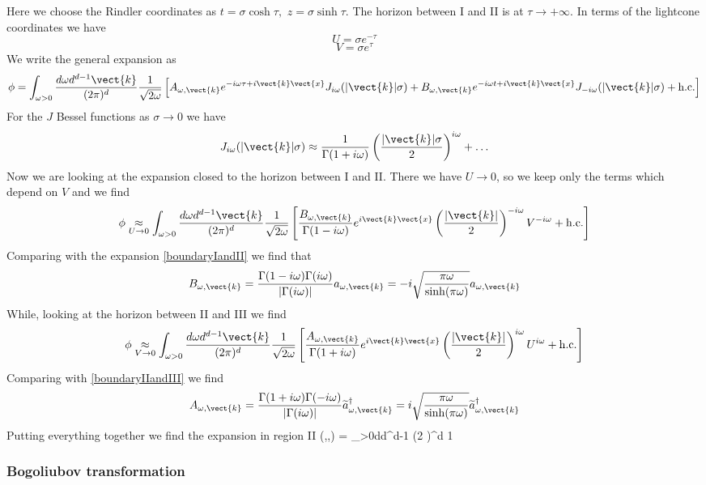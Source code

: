 Here we choose the Rindler coordinates as $t =\sigma  \cosh \tau,\,\, z = \sigma \sinh \tau$. The horizon between I and II is at $\tau\rightarrow +\infty$. In terms of the lightcone coordinates
we have
\[
U = \sigma e^{-\tau}
\]
\[
V = \sigma e^{\tau}
\]
We write the general expansion 
as
\[
\phi = \int_{\omega>0}{d\omega d^{d-1}\vect{k} \over (2 \pi)^d} {1\over \sqrt{2\omega}}\left[A_{\omega,\vect{k}}e^{-i \omega \tau + i \vect{k}\vect{x}} J_{i\omega}(|\vect{k}|\sigma) +
B_{\omega,\vect{k}} e^{-i \omega t + i \vect{k} \vect{x}} J_{-i \omega}(|\vect{k}|\sigma) + {\rm h.c.} \right]
\]
For the $J$ Bessel functions as $\sigma\rightarrow 0$ we have
\[
J_{i\omega}(|\vect{k}|\sigma) \approx {1\over \Gamma(1+i\omega)} \left({|\vect{k}|\sigma \over 2}\right)^{i\omega} +\ldots
\]
Now we are looking at the expansion closed to the horizon between I and II. There we have $U\rightarrow 0$, 
so we keep only the terms which depend on $V$ and we find
\[
\phi \underset{U \rightarrow 0}{\approx} \int_{\omega>0}{d\omega d^{d-1}\vect{k} \over (2 \pi)^d} {1\over \sqrt{2\omega}}
\left[
{B_{\omega,\vect{k}}\over \Gamma(1-i\omega)} e^{i\vect{k} \vect{x}}\left({|\vect{k}|\over 2}\right)^{-i\omega} V^{-i\omega}+{\rm h.c.}
\right]
\]
Comparing with the expansion \eqref{boundaryIandII} we find that
\[
B_{\omega,\vect{k}} = {\Gamma(1-i\omega) \Gamma(i\omega) \over |\Gamma(i\omega)|}a_{\omega,\vect{k}}= -i\sqrt{\pi \omega \over \sinh(\pi \omega)} a_{\omega,\vect{k}}
\]
While, looking at the horizon between II and III we find
\[
\phi \underset{V \rightarrow 0}{\approx} \int_{\omega>0} {d\omega d^{d-1} \vect{k}  \over (2 \pi)^d} {1\over \sqrt{2\omega}} \left[{A_{\omega,\vect{k}}\over \Gamma(1+i\omega)}e^{i\vect{k}\vect{x}}
\left({|\vect{k}|\over 2}\right)^{i\omega}U^{i\omega} + {\rm h.c.}
\right]
\]
Comparing with \eqref{boundaryIIandIII} we find
\[
A_{\omega,\vect{k}} = {\Gamma(1+i\omega)\Gamma(-i\omega) \over |\Gamma(i\omega)|}\widetilde{a}_{\omega,\vect{k}}^\dagger
=i\sqrt{\pi \omega \over \sinh(\pi \omega)} \widetilde{a}_{\omega,\vect{k}}^\dagger
\]
Putting everything together we find the expansion in region II
\be
\label{regionIIrindler}
\phi(\tau,\sigma,) = \int_{\omega>0}{d\omega d^{d-1}  \over (2 \pi)^d} {1\over \sqrt{2\omega}}\sqrt{\pi \omega\over \sinh(\pi \omega)} 
\ee 	
\subsubsection{Bogoliubov transformation}

